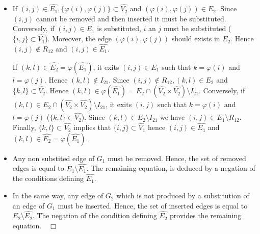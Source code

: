   \begin{itemize}
  \item If
    $(i,j)\in \hat{E_1}, \{\varphi(i),\varphi(j)\}\subset \hat{V_2}$
    and $(\varphi(i),\varphi(j))\in E_2$. Since $(i,j)$ cannot be
    removed and then inserted it must be substituted. Conversely, if
    $(i,j)\in E_1$ is substituted, $i$ an $j$ must be substituted
    ($\{i,j\}\subset \hat{V_1}$). Moreover, the edge
    $(\varphi(i),\varphi(j))$ should exists in $E_2$. Hence
    $(i,j)\not\in R_{12}$ and $(i,j)\in \hat{E_1}$. 

    If $(k,l)\in \hat{E_2}=\varphi(\hat{E_1})$, it exits
    $(i,j)\in E_1$ such that $k=\varphi(i)$ and $l=\varphi(j)$. Hence
    $(k,l)\not\in I_{21}$. Since $(i,j)\not\in R_{12}, (k,l)\in E_2$
    and $\{k,l\}\subset \hat{V_2}$. Hence
    $(k,l)\in \varphi(\hat{E_1})=E_2\cap
    (\hat{V_2}\times\hat{V_2})\setminus I_{21}$.
    Conversely, if
    $(k,l)\in E_2\cap (\hat{V_2}\times\hat{V_2})\setminus I_{21}$, it exits
    $(i,j)$ such that $k=\varphi(i)$ and $l=\varphi(j)$
    ($\{k,l\}\in \hat{V_2}$). Since $(k,l)\in E_2\setminus I_{21}$ we have
    $(i,j)\in E_1\setminus R_{12}$. Finally, $\{k,l\}\subset \hat{V_2}$ implies
    that $\{i,j\}\subset \hat{V_1}$ hence $(i,j)\in \hat{E_1}$ and
    $(k,l)\in \hat{E_2}=\varphi(\hat{E_1})$.
  \item Any non substited edge of $G_1$ must be removed. Hence, the
    set of removed edges is equal to $E_1\setminus\hat{E_1}$. The remaining
    equation, is deduced by a negation of the conditions defining
    $\hat{E_1}$.
  \item In the same way, any edge of $G_2$ which is not produced by a
    substitution of an edge of $G_1$ must be inserted. Hence, the set
    of inserted edges is equal to $E_2\setminus\hat{E_2}$. The negation of the
    condition defining $\hat{E_2}$ provides the remaining equation.~~$\Box$
  \end{itemize}
